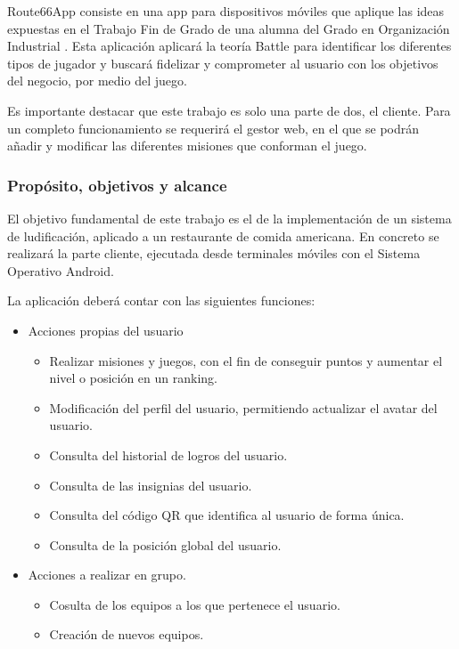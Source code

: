 \documentclass[twoside]{report}
\begin{document}
Route66App consiste en una app para dispositivos móviles que aplique las ideas expuestas en el Trabajo Fin de Grado de una alumna del Grado en Organización Industrial \cite{cristinatfg}. Esta aplicación aplicará la teoría Battle para identificar los diferentes tipos de jugador y buscará fidelizar y comprometer al usuario con los objetivos del negocio, por medio del juego.

Es importante destacar que este trabajo es solo una parte de dos, el cliente. Para un completo funcionamiento se requerirá el gestor web, en el que se podrán añadir y modificar las diferentes misiones que conforman el juego. 
\subsubsection{Propósito, objetivos y alcance}

El objetivo fundamental de  este trabajo es el de la implementación de un sistema de ludificación, aplicado a un restaurante de comida americana. En concreto se realizará la parte cliente, ejecutada desde terminales móviles con el Sistema Operativo Android.

La aplicación deberá contar con las siguientes funciones:
\begin{itemize}
\item Acciones propias del usuario

	\begin{itemize}
	\item Realizar misiones y juegos, con el fin de conseguir puntos y aumentar el nivel o posición en un ranking.
	\item Modificación del perfil del usuario, permitiendo actualizar el avatar del usuario.
	\item Consulta del historial de logros del usuario.
	\item Consulta de las insignias del usuario.
	\item Consulta del código QR que identifica al usuario de forma única.
	\item Consulta de la posición global del usuario.
	\end{itemize}

\item Acciones a realizar en grupo.
	\begin{itemize}
	\item Cosulta de los equipos a los que pertenece el usuario.
	\item Creación de nuevos equipos.
	\end{itemize}
\end{itemize}
\end{document}
